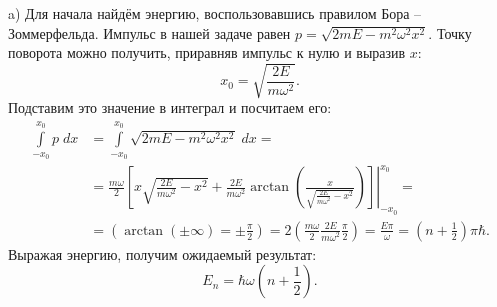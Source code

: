 a) Для начала найдём энергию, воспользовавшись правилом Бора -- Зоммерфельда.
Импульс в нашей задаче равен $p = \sqrt{2mE - m^2\omega^2x^2}$. Точку поворота
можно получить, приравняв импульс к нулю и выразив $x$:
\[
  x_0 = \sqrt{\frac{2E}{m\omega^2}}.
\]
Подставим это значение в интеграл и посчитаем его:
\begin{align*}
  \int\limits_{-x_0}^{x_0}p\;dx & = \int\limits_{-x_0}^{x_0}\sqrt{2mE - m^2\omega^2x^2}\;dx =\\
  & = \left.\frac{m\omega}{2}\left[x\sqrt{\frac{2E}{m\omega^2}- x^2} + \frac{2E}{m\omega^2}\arctan\left( \frac{x}{\sqrt{\frac{2E}{m\omega^2} - x^2}} \right)\right]\right|_{-x_0}^{x_0} = \\
  & = \left( \arctan(\pm\infty) = \pm\frac{\pi}{2}\right) = 2\left(\frac{m\omega}{2}\frac{2E}{m\omega^2}\frac{\pi}{2}\right) = \frac{E\pi}{\omega} = \left(n + \frac{1}{2}\right)\pi\hbar.
\end{align*}
Выражая энергию, получим ожидаемый результат:
\[
  E_n = \hbar\omega\left(n + \frac{1}{2}\right).
\]


